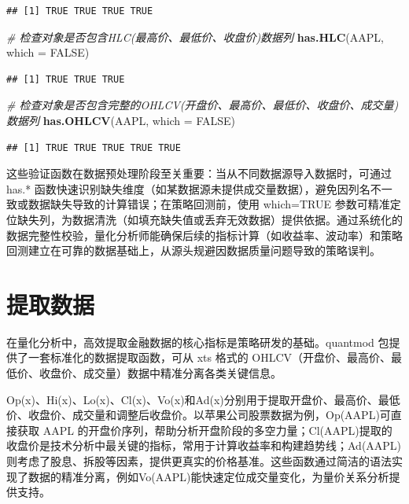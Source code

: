 \documentclass[]{ctexbook}
\newenvironment{Shaded}{\begin{snugshade}}{\end{snugshade}}
\newcommand{\AttributeTok}[1]{\textcolor[rgb]{0.13,0.29,0.53}{#1}}
\newcommand{\CommentTok}[1]{\textcolor[rgb]{0.56,0.35,0.01}{\textit{#1}}}
\newcommand{\ConstantTok}[1]{\textcolor[rgb]{0.56,0.35,0.01}{#1}}
\newcommand{\FunctionTok}[1]{\textcolor[rgb]{0.13,0.29,0.53}{\textbf{#1}}}
\newcommand{\NormalTok}[1]{#1}
\begin{document}
\begin{verbatim}
## [1] TRUE TRUE TRUE TRUE
\end{verbatim}

\begin{Shaded}
\begin{Highlighting}[]
\CommentTok{\# 检查对象是否包含HLC(最高价、最低价、收盘价)数据列}
\FunctionTok{has.HLC}\NormalTok{(AAPL, }\AttributeTok{which =} \ConstantTok{FALSE}\NormalTok{)}
\end{Highlighting}
\end{Shaded}

\begin{verbatim}
## [1] TRUE TRUE TRUE
\end{verbatim}

\begin{Shaded}
\begin{Highlighting}[]
\CommentTok{\# 检查对象是否包含完整的OHLCV(开盘价、最高价、最低价、收盘价、成交量)数据列}
\FunctionTok{has.OHLCV}\NormalTok{(AAPL, }\AttributeTok{which =} \ConstantTok{FALSE}\NormalTok{)}
\end{Highlighting}
\end{Shaded}

\begin{verbatim}
## [1] TRUE TRUE TRUE TRUE TRUE
\end{verbatim}

这些验证函数在数据预处理阶段至关重要：当从不同数据源导入数据时，可通过 has.* 函数快速识别缺失维度（如某数据源未提供成交量数据），避免因列名不一致或数据缺失导致的计算错误；在策略回测前，使用 which=TRUE 参数可精准定位缺失列，为数据清洗（如填充缺失值或丢弃无效数据）提供依据。通过系统化的数据完整性校验，量化分析师能确保后续的指标计算（如收益率、波动率）和策略回测建立在可靠的数据基础上，从源头规避因数据质量问题导致的策略误判。

\section{提取数据}\label{ux63d0ux53d6ux6570ux636e}

在量化分析中，高效提取金融数据的核心指标是策略研发的基础。quantmod 包提供了一套标准化的数据提取函数，可从 xts 格式的 OHLCV（开盘价、最高价、最低价、收盘价、成交量）数据中精准分离各类关键信息。

Op(x)、Hi(x)、Lo(x)、Cl(x)、Vo(x)和Ad(x)分别用于提取开盘价、最高价、最低价、收盘价、成交量和调整后收盘价。以苹果公司股票数据为例，Op(AAPL)可直接获取 AAPL 的开盘价序列，帮助分析开盘阶段的多空力量；Cl(AAPL)提取的收盘价是技术分析中最关键的指标，常用于计算收益率和构建趋势线；Ad(AAPL)则考虑了股息、拆股等因素，提供更真实的价格基准。这些函数通过简洁的语法实现了数据的精准分离，例如Vo(AAPL)能快速定位成交量变化，为量价关系分析提供支持。
\end{document}
